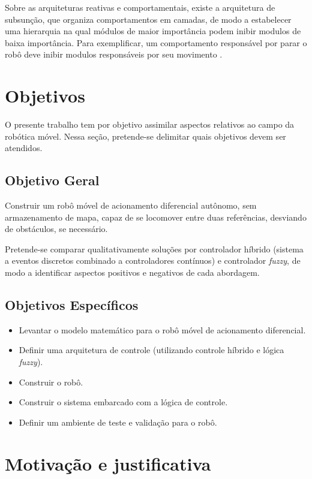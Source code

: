 Sobre as arquiteturas reativas e comportamentais, existe a arquitetura de subsunção, que 
organiza comportamentos em camadas, de modo a estabelecer uma hierarquia na qual módulos de 
maior importância podem inibir modulos de baixa importância. Para exemplificar, um 
comportamento responsável por parar o robô deve inibir modulos responsáveis por seu 
movimento \cite{Livro_Mataric}.

\section{Objetivos}

O presente trabalho tem por objetivo assimilar aspectos relativos ao campo da
robótica móvel. Nessa seção, pretende-se delimitar quais objetivos devem ser
atendidos.

	\subsection{Objetivo Geral}
	
	Construir um robô móvel de acionamento diferencial autônomo, sem
	armazenamento de mapa, capaz de se locomover entre duas referências, desviando
	de obstáculos, se necessário.
	
	Pretende-se comparar qualitativamente soluções por controlador híbrido
	(sistema a eventos discretos combinado a controladores contínuos) e controlador
	\textit{fuzzy}, de modo a identificar aspectos positivos e negativos de cada
	abordagem.
 	
	\subsection{Objetivos Específicos}
 
	\begin{itemize}
	  \item Levantar o modelo matemático para o robô móvel de acionamento
	  diferencial.
	  \item Definir uma arquitetura de controle (utilizando controle híbrido e
	  lógica \textit{fuzzy}).
	  \item Construir o robô. 
	  \item Construir o sistema embarcado com a lógica de controle.
	  \item Definir um ambiente de teste e validação para o robô. 
	\end{itemize}
	
\section{Motivação e justificativa}


